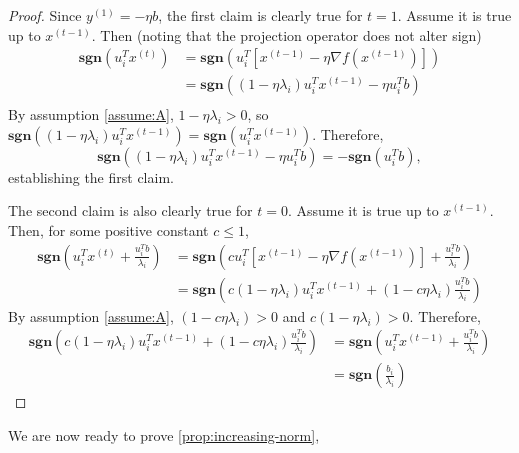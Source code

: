 \documentclass[11pt]{article}
\begin{document}
\begin{proof}
Since $y^{(1)} = -\eta b$, the first claim is clearly true for $t = 1$. Assume it is true up to $x^{(t-1)}$. Then (noting that the projection operator does not alter sign)
\begin{align*}
\mathbf{sgn}(u_i^Tx^{(t)}) &= \mathbf{sgn}\left(u_i^T\left[ x^{(t-1)} - \eta \nabla f(x^{(t-1)})\right] \right) \\
					&= \mathbf{sgn}\left( (1 - \eta \lambda_i)u_i^Tx^{(t-1)} - \eta u_i^Tb\right) \\
\end{align*}
By assumption \ref{assume:A}, $1 - \eta \lambda_i > 0$, so $\mathbf{sgn}\left( (1 - \eta \lambda_i)u_i^Tx^{(t-1)}\right) = \mathbf{sgn}\left(u_i^Tx^{(t-1)}\right)$. Therefore,
\[
\mathbf{sgn}\left( (1 - \eta \lambda_i)u_i^Tx^{(t-1)} - \eta u_i^Tb\right) = -\mathbf{sgn}(u_i^Tb),
\]
establishing the first claim.

The second claim is also clearly true for $t = 0$. Assume it is true up to $x^{(t-1)}$. Then, for some positive constant $c \leq1$,
\begin{align*}
\mathbf{sgn}\left(u_i^Tx^{(t)} + \frac{u_i^Tb}{\lambda_i}\right)  
	&= \mathbf{sgn}\left(c u_i^T\left[ x^{(t-1)} - \eta \nabla f(x^{(t-1)}) \right] + \frac{u_i^Tb}{\lambda_i}\right) \\
	&= \mathbf{sgn}\left(c(1 - \eta \lambda_i)u_i^Tx^{(t-1)} + (1 - c\eta \lambda_i) \frac{u_i^Tb}{\lambda_i} \right)
\end{align*}
By assumption \ref{assume:A}, $(1 - c\eta \lambda_i) > 0$ and $c(1 - \eta \lambda_i) > 0$. Therefore, 
\begin{align*}
\mathbf{sgn}\left(c(1 - \eta \lambda_i)u_i^Tx^{(t-1)} + (1 - c\eta \lambda_i) \frac{u_i^Tb}{\lambda_i} \right)
	&= \mathbf{sgn}\left(u_i^Tx^{(t-1)} + \frac{u_i^Tb}{\lambda_i}\right) \\
	&= \mathbf{sgn}\left(\frac{b_i}{\lambda_i}\right) 
\end{align*}
\end{proof}
We are now ready to prove \ref{prop:increasing-norm},
\end{document}
